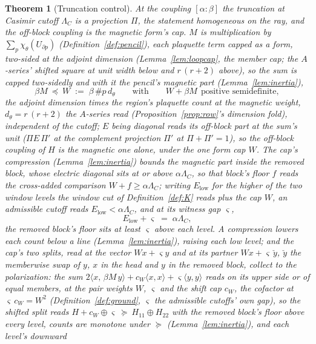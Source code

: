 \documentclass[11pt]{article}
\newtheorem{theorem}{Theorem}
\theoremstyle{definition}
\begin{document}
\begin{theorem}[Truncation control]\label{thm:truncation}
At the coupling $[\alpha\!:\!\beta]$ the truncation at Casimir cutoff
$\Lambda_C$ is a projection $\Pi$, the statement homogeneous on the ray,
and the off-block coupling is the magnetic form's cap. $M$ is
multiplication by
$\sum_p\chi_\theta(U_{\partial p})$ (Definition~\ref{def:pencil}), each
plaquette term capped as a form, two-sided at the adjoint
dimension (Lemma~\ref{lem:loopcap}, the member cap; the
$A$-series' shifted square at unit width below and $r\,(r+2)$
above), so the sum is capped two-sidedly and with
it the pencil's magnetic part (Lemma~\ref{lem:inertia}),
\[
\beta M\ \preceq\ W\;:=\;\beta\,\#p\,d_\theta
\qquad\text{with}\qquad
W+\beta M\ \ \text{positive semidefinite},
\]
the adjoint dimension times the region's plaquette count at the
magnetic weight, $d_\theta=r\,(r+2)$ the $A$-series read
(Proposition~\ref{prop:row}'s dimension fold),
independent of the cutoff; $E$ being diagonal reads its off-block
part at the sum's unit ($\Pi E\,\Pi'$ at the complement projection
$\Pi'$ at $\Pi+\Pi'=1$), so the off-block coupling of $H$ is the magnetic one
alone, under the one form cap $W$. The cap's compression
(Lemma~\ref{lem:inertia}) bounds the magnetic part inside the removed
block, whose electric diagonal sits at or above $\alpha\Lambda_C$, so that
block's floor $f$ reads the cross-added comparison
$W+f\ge\alpha\Lambda_C$;
writing $E_{\mathrm{low}}$ for the higher of the two window levels the window cut of
Definition~\ref{def:K} reads plus the cap $W$, an admissible cutoff
reads $E_{\mathrm{low}}<\alpha\Lambda_C$, and at its witness gap
$\varsigma$,
\[
E_{\mathrm{low}}+\varsigma\;=\;\alpha\Lambda_C,
\]
the removed block's floor sits at least $\varsigma$ above each level.
A compression lowers each count below a line (Lemma~\ref{lem:inertia}),
raising each low level; and the cap's two splits, read at the vector
$Wx+\varsigma y$ and at its partner $Wx+\varsigma\,\check y$, $\check
y$ the memberwise swap of $y$, $x$ in the head and $y$ in the
removed block, collect to the polarization:
the sum $2\langle x,\,\beta M\,y\rangle+c_W\langle
x,x\rangle+\varsigma\langle y,y\rangle$ reads on its upper side or of equal
members, at the pair weights $W$,
$\varsigma$ and the \emph{shift cap} $c_W$, the cofactor at
$\varsigma\,c_W=W^2$ (Definition~\ref{def:ground}, $\varsigma$
the admissible cutoffs' own gap), so the shifted split reads
$H+c_W\!\oplus\!\varsigma\ \succeq\ H_{11}\!\oplus\!H_{22}$
with the removed block's floor above every level, counts are monotone
under $\succeq$ (Lemma~\ref{lem:inertia}), and each level's downward

\end{theorem}
\end{document}
